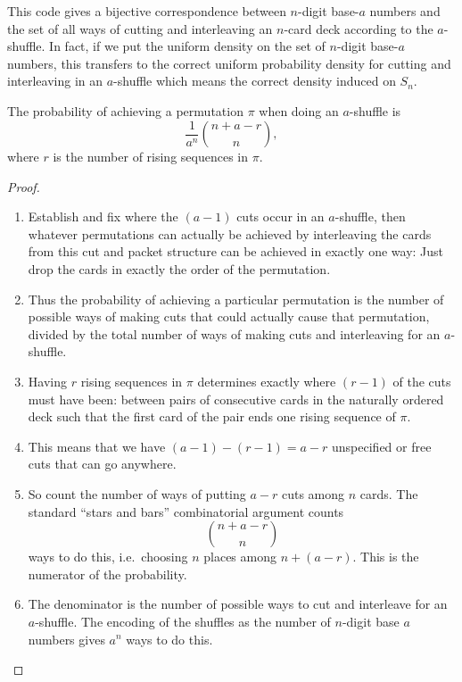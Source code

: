 \documentclass[12pt]{article}
\begin{document}
This code gives a bijective correspondence between \( n \)-digit base-\(
a \) numbers and the set of all ways of cutting and interleaving an \( n
\)-card deck according to the \( a \)-shuffle.  In fact, if we put the
uniform density on the set of \( n \)-digit base-\( a \) numbers, this
transfers to the correct uniform probability density for cutting and
interleaving in an \( a \)-shuffle which means the correct density
induced on \( S_n \).

\begin{theorem}
    The probability of achieving a permutation \( \pi \) when doing an \(
    a \)-shuffle is
    \[
        \frac{1}{a^n} \binom{n + a - r}{n},
    \] where \( r \) is the number of rising sequences in \( \pi \).
\end{theorem}

\begin{proof}
    \begin{enumerate}
        \item
            Establish and fix where the \( (a-1) \) cuts occur in an \(
            a \)-shuffle, then whatever permutations can actually be
            achieved by interleaving the cards from this cut and packet
            structure can be achieved in exactly one way:  Just drop the
            cards in exactly the order of the permutation.
        \item
            Thus the probability of achieving a particular permutation
            is the number of possible ways of making cuts that could
            actually cause that permutation, divided by the total number
            of ways of making cuts and interleaving for an \( a \)-shuffle.
        \item
            Having \( r \) rising sequences in \( \pi \) determines
            exactly where \( (r-1) \) of the cuts must have been:
            between pairs of consecutive cards in the naturally ordered
            deck such that the first card of the pair ends one rising
            sequence of \( \pi \).
        \item
            This means that we have \( (a-1) - (r-1) = a-r \)
            unspecified or free cuts that can go anywhere.
        \item
            So count the number of ways of putting \( a-r \) cuts among \(
            n \) cards.  The standard ``stars and bars'' combinatorial
            argument counts
            \[
                \binom{n + a-r}{n}
            \] ways to do this, i.e.\ choosing \( n \) places among \( n
            +(a-r) \).  This is the numerator of the probability.
        \item
            The denominator is the number of possible ways to cut and
            interleave for an \( a \)-shuffle.  The encoding of the
            shuffles as the number of \( n \)-digit base \( a \) numbers
            gives \( a^n \) ways to do this.
    \end{enumerate}
\end{proof}
\end{document}
